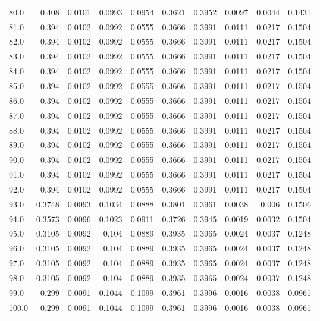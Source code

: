 \begin{longtable}{lrrrrrrrrr}
80.0 & 0.408 & 0.0101 & 0.0993 & 0.0954 & 0.3621 & 0.3952 & 0.0097 & 0.0044 & 0.1431 \\
81.0 & 0.394 & 0.0102 & 0.0992 & 0.0555 & 0.3666 & 0.3991 & 0.0111 & 0.0217 & 0.1504 \\
82.0 & 0.394 & 0.0102 & 0.0992 & 0.0555 & 0.3666 & 0.3991 & 0.0111 & 0.0217 & 0.1504 \\
83.0 & 0.394 & 0.0102 & 0.0992 & 0.0555 & 0.3666 & 0.3991 & 0.0111 & 0.0217 & 0.1504 \\
84.0 & 0.394 & 0.0102 & 0.0992 & 0.0555 & 0.3666 & 0.3991 & 0.0111 & 0.0217 & 0.1504 \\
85.0 & 0.394 & 0.0102 & 0.0992 & 0.0555 & 0.3666 & 0.3991 & 0.0111 & 0.0217 & 0.1504 \\
86.0 & 0.394 & 0.0102 & 0.0992 & 0.0555 & 0.3666 & 0.3991 & 0.0111 & 0.0217 & 0.1504 \\
87.0 & 0.394 & 0.0102 & 0.0992 & 0.0555 & 0.3666 & 0.3991 & 0.0111 & 0.0217 & 0.1504 \\
88.0 & 0.394 & 0.0102 & 0.0992 & 0.0555 & 0.3666 & 0.3991 & 0.0111 & 0.0217 & 0.1504 \\
89.0 & 0.394 & 0.0102 & 0.0992 & 0.0555 & 0.3666 & 0.3991 & 0.0111 & 0.0217 & 0.1504 \\
90.0 & 0.394 & 0.0102 & 0.0992 & 0.0555 & 0.3666 & 0.3991 & 0.0111 & 0.0217 & 0.1504 \\
91.0 & 0.394 & 0.0102 & 0.0992 & 0.0555 & 0.3666 & 0.3991 & 0.0111 & 0.0217 & 0.1504 \\
92.0 & 0.394 & 0.0102 & 0.0992 & 0.0555 & 0.3666 & 0.3991 & 0.0111 & 0.0217 & 0.1504 \\
93.0 & 0.3748 & 0.0093 & 0.1034 & 0.0888 & 0.3801 & 0.3961 & 0.0038 & 0.006 & 0.1506 \\
94.0 & 0.3573 & 0.0096 & 0.1023 & 0.0911 & 0.3726 & 0.3945 & 0.0019 & 0.0032 & 0.1504 \\
95.0 & 0.3105 & 0.0092 & 0.104 & 0.0889 & 0.3935 & 0.3965 & 0.0024 & 0.0037 & 0.1248 \\
96.0 & 0.3105 & 0.0092 & 0.104 & 0.0889 & 0.3935 & 0.3965 & 0.0024 & 0.0037 & 0.1248 \\
97.0 & 0.3105 & 0.0092 & 0.104 & 0.0889 & 0.3935 & 0.3965 & 0.0024 & 0.0037 & 0.1248 \\
98.0 & 0.3105 & 0.0092 & 0.104 & 0.0889 & 0.3935 & 0.3965 & 0.0024 & 0.0037 & 0.1248 \\
99.0 & 0.299 & 0.0091 & 0.1044 & 0.1099 & 0.3961 & 0.3996 & 0.0016 & 0.0038 & 0.0961 \\
100.0 & 0.299 & 0.0091 & 0.1044 & 0.1099 & 0.3961 & 0.3996 & 0.0016 & 0.0038 & 0.0961 \\

\end{longtable}
